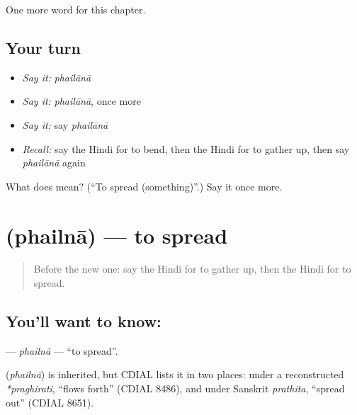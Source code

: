 \begin{grammarlens}[title={What you've built}]
One more word for this chapter.
\end{grammarlens}

\subsection*{Your turn}
\begin{itemize}
\raggedright
  \item \emph{Say it:} \emph{phailānā}
  \item \emph{Say it:} \emph{phailānā}, once more
  \item \emph{Say it:} say \emph{phailānā}
  \item \emph{Recall:} say the Hindi for to bend, then the Hindi for to gather up, then say \emph{phailānā} again
\end{itemize}

\begin{tcolorbox}[breakable,colback=teal!4,colframe=teal!35!black,title={Before you move on}]
What does  mean? (\textquotedblleft{}To spread (something)\textquotedblright{}.) Say it once more.
\end{tcolorbox}
\section[\texorpdfstring{\hi{फैलना} (phailnā)}{फैलना (phailnā)}]{ (phailnā) — to spread}

\label{lesson:HI-C229-phailna}



\begin{quote}
Before the new one: say the Hindi for to gather up, then the Hindi for to spread.
\end{quote}

\subsection*{You'll want to know: }
\textbf{} — \emph{phailnā} — \textquotedblleft{}to spread\textquotedblright{}.

\begin{cousinweb}
\textbf{} (\emph{phailnā}) is inherited, but CDIAL lists it in two places: under a reconstructed \emph{*praghirati}, \textquotedblleft{}flows forth\textquotedblright{} (CDIAL 8486), and under Sanskrit \emph{prathita}, \textquotedblleft{}spread out\textquotedblright{} (CDIAL 8651).
\end{cousinweb}

